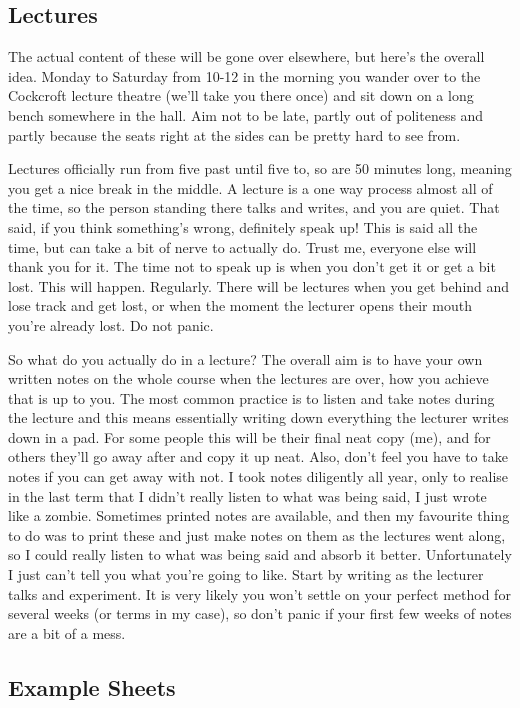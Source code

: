\documentclass[a4paper,11pt]{article}
\begin{document}
\subsection{Lectures}

The actual content of these will be gone over elsewhere, but here's the overall idea. Monday to Saturday from 10-12 in the morning you wander over to the Cockcroft lecture theatre (we'll take you there once) and sit down on a long bench somewhere in the hall. Aim not to be late, partly out of politeness and partly because the seats right at the sides can be pretty hard to see from. 

Lectures officially run from five past until five to, so are 50 minutes long, meaning you get a nice break in the middle. A lecture is a one way process almost all of the time, so the person standing there talks and writes, and you are quiet. That said, if you think something's wrong, definitely speak up! This is said all the time, but can take a bit of nerve to actually do. Trust me, everyone else will thank you for it. The time not to speak up is when you don't get it or get a bit lost. This will happen. Regularly. There will be lectures when you get behind and lose track and get lost, or when the moment the lecturer opens their mouth you're already lost. Do not panic. 

So what do you actually do in a lecture? The overall aim is to have your own written notes on the whole course when the lectures are over, how you achieve that is up to you. The most common practice is to listen and take notes during the lecture and this means essentially writing down everything the lecturer writes down in a pad. For some people this will be their final neat copy (me), and for others they'll go away after and copy it up neat. Also, don't feel you have to take notes if you can get away with not. I took notes diligently all year, only to realise in the last term that I didn't really listen to what was being said, I just wrote like a zombie. Sometimes printed notes are available, and then my favourite thing to do was to print these and just make notes on them as the lectures went along, so I could really listen to what was being said and absorb it better. Unfortunately I just can't tell you what you're going to like. Start by writing as the lecturer talks and experiment. It is very likely you won't settle on your perfect method for several weeks (or terms in my case), so don't panic if your first few weeks of notes are a bit of a mess. 

\subsection{Example Sheets}
\end{document}
